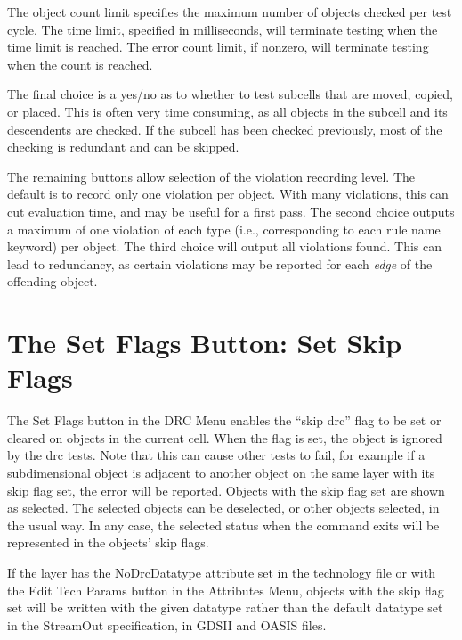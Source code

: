 The object count limit specifies the maximum number of objects checked
per test cycle.  The time limit, specified in milliseconds, will
terminate testing when the time limit is reached.  The error count
limit, if nonzero, will terminate testing when the count is reached.

The final choice is a yes/no as to whether to test subcells that are
moved, copied, or placed.  This is often very time consuming, as all
objects in the subcell and its descendents are checked.  If the
subcell has been checked previously, most of the checking is redundant
and can be skipped.

The remaining buttons allow selection of the violation recording
level.  The default is to record only one violation per object.  With
many violations, this can cut evaluation time, and may be useful for a
first pass.  The second choice outputs a maximum of one violation of
each type (i.e., corresponding to each rule name keyword) per object. 
The third choice will output all violations found.  This can lead to
redundancy, as certain violations may be reported for each {\it edge}
of the offending object.


\section{The {\cb Set Flags} Button: Set Skip Flags}
The {\cb Set Flags} button in the {\cb DRC Menu} enables the ``skip
drc'' flag to be set or cleared on objects in the current cell.  When
the flag is set, the object is ignored by the drc tests.  Note that
this can cause other tests to fail, for example if a subdimensional
object is adjacent to another object on the same layer with its skip
flag set, the error will be reported.  Objects with the skip flag set
are shown as selected.  The selected objects can be deselected, or
other objects selected, in the usual way.  In any case, the selected
status when the command exits will be represented in the objects' skip
flags.

If the layer has the {\et NoDrcDatatype} attribute set in the
technology file or with the {\cb Edit Tech Params} button in the {\cb
Attributes Menu}, objects with the skip flag set will be written with
the given datatype rather than the default datatype set in the {\et
StreamOut} specification, in GDSII and OASIS files.

